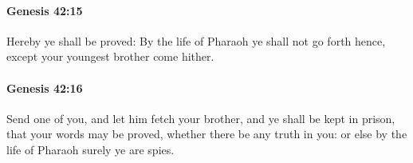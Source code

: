 		\paragraph{Genesis 42:15} %
			\label{GENESIS-42-15}

			Hereby ye shall be proved: By the life of Pharaoh ye shall not go forth hence, except your youngest brother come hither.


		\paragraph{Genesis 42:16} %
			\label{GENESIS-42-16}

			Send one of you, and let him fetch your brother, and ye shall be kept in prison, that your words may be proved, whether there be any truth in you: or else by the life of Pharaoh surely ye are spies.


